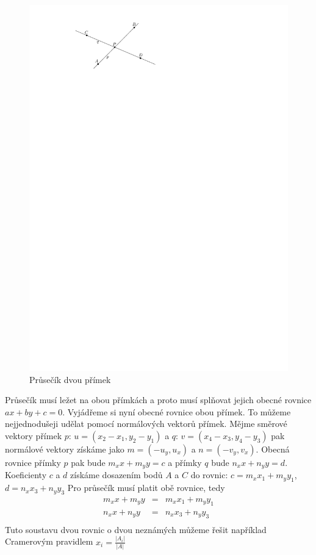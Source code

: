 \begin{figure}[h]
	\centering
	\includegraphics{../img/prusecik.pdf}
	\caption{Průsečík dvou přímek}
	\label{fig:prusecik}
\end{figure}

Průsečík musí ležet na obou přímkách a proto musí splňovat jejich obecné rovnice
$ax+by+c=0$.  Vyjádřeme si nyní obecné rovnice obou přímek. To můžeme
nejjednodušeji udělat pomocí normálových vektorů přímek. Mějme směrové vektory
přímek $p$: $u = (x_2-x_1,y_2-y_1)$ a $q$: $v=(x_4-x_3,y_4-y_3)$ pak normálové
vektory získáme jako $m = (-u_y,u_x)$ a $n = (-v_y,v_x)$. Obecná rovnice přímky
$p$ pak bude $m_xx+m_yy=c$ a přímky $q$ bude $n_xx+n_yy=d$. Koeficienty $c$ a
$d$ získáme dosazením bodů $A$ a $C$ do rovnic: $c = m_xx_1+m_yy_1$,
$d=n_xx_3+n_yy_3$ Pro průsečík musí platit obě rovnice, tedy 
\begin{eqnarray*}
m_xx+m_yy &=& m_xx_1+m_yy_1\\
n_xx+n_yy &=& n_xx_3+n_yy_3\\
\end{eqnarray*}
Tuto soustavu dvou rovnic o dvou neznámých můžeme řešit například Cramerovým
pravidlem $x_i = \frac{|A_i|}{|A|}$

